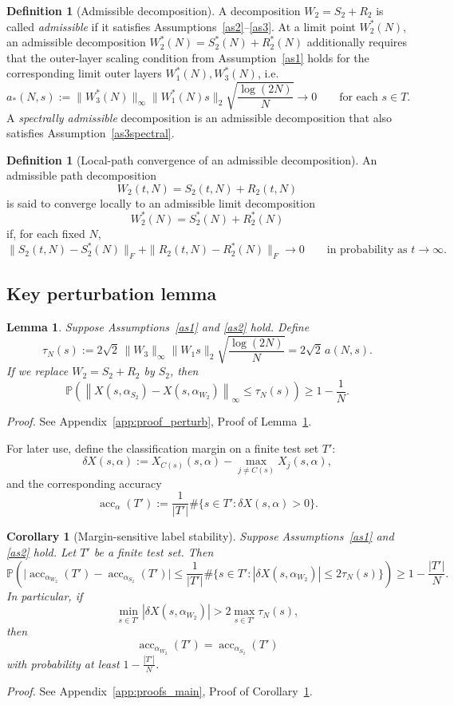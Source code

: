 \documentclass[11pt]{article}
\theoremstyle{plain}
\newtheorem{cor}[thm]{Corollary}
\newtheorem{lem}[thm]{Lemma}
\theoremstyle{definition}
\newtheorem{defn}[thm]{Definition}
\theoremstyle{remark}
\newcommand{\PP}{\mathbb{P}}
\newcommand{\acc}{\operatorname{acc}}
\newcommand{\1}{\mathbf{1}}
\newcommand{\proofloc}[1]{\par\noindent\emph{Proof.} #1\par}
\begin{document}
\begin{defn}[Admissible decomposition]
\label{def:admissible_decomposition}
A decomposition \(W_2=S_2+R_2\) is called \emph{admissible} if it satisfies Assumptions~\ref{as2}--\ref{as3}. At a limit point \(W_2^*(N)\), an admissible decomposition \(W_2^*(N)=S_2^*(N)+R_2^*(N)\) additionally requires that the outer-layer scaling condition from Assumption~\ref{as1} holds for the corresponding limit outer layers \(W_1^*(N),W_3^*(N)\), i.e.
\[
a_*(N,s):=\|W_3^*(N)\|_\infty\|W_1^*(N)s\|_2\sqrt{\frac{\log(2N)}{N}}\to0
\qquad \text{for each } s\in T.
\]
A \emph{spectrally admissible} decomposition is an admissible decomposition that also satisfies Assumption~\ref{as3spectral}.
\end{defn}

\begin{defn}[Local-path convergence of an admissible decomposition]
\label{def:local_path_convergence}
An admissible path decomposition
\[
W_2(t,N)=S_2(t,N)+R_2(t,N)
\]
is said to converge locally to an admissible limit decomposition
\[
W_2^*(N)=S_2^*(N)+R_2^*(N)
\]
if, for each fixed \(N\),
\[
\|S_2(t,N)-S_2^*(N)\|_F+\|R_2(t,N)-R_2^*(N)\|_F\to0
\qquad\text{in probability as }t\to\infty.
\]
\end{defn}

\subsection{Key perturbation lemma}
\label{subsec:key_perturbation_lemma}

\begin{lem}
\label{lem:remove_R}
Suppose Assumptions~\ref{as1} and \ref{as2} hold. Define
\[
\tau_N(s):=
2\sqrt{2}\,\|W_3\|_\infty \|W_1s\|_2\sqrt{\frac{\log(2N)}{N}}
=2\sqrt{2}\,a(N,s).
\]
If we replace \(W_2=S_2+R_2\) by \(S_2\), then
\[
\PP\!\left(
\left\|X(s,\alpha_{S_2})-X(s,\alpha_{W_2})\right\|_\infty
\le \tau_N(s)
\right)
\ge 1-\frac{1}{N}.
\]
\end{lem}
\proofloc{See Appendix~\ref{app:proof_perturb}, Proof of Lemma~\ref{lem:remove_R}.}

For later use, define the classification margin on a finite test set \(T'\):
\[
\delta X(s,\alpha):=
X_{C(s)}(s,\alpha)-\max_{j\neq C(s)}X_j(s,\alpha),
\]
and the corresponding accuracy
\[
\acc_\alpha(T'):=\frac1{|T'|}\#\{s\in T':\delta X(s,\alpha)>0\}.
\]

\begin{cor}[Margin-sensitive label stability]
\label{cor:margin_accuracy}
Suppose Assumptions~\ref{as1} and \ref{as2} hold. Let \(T'\) be a finite test set. Then
\[
\PP\!\left(
\big|\acc_{\alpha_{W_2}}(T')-\acc_{\alpha_{S_2}}(T')\big|
\le
\frac1{|T'|}
\#\Big\{
s\in T': |\delta X(s,\alpha_{W_2})|\le 2\tau_N(s)
\Big\}
\right)
\ge
1-\frac{|T'|}{N}.
\]
In particular, if
\[
\min_{s\in T'} |\delta X(s,\alpha_{W_2})|
>
2\max_{s\in T'}\tau_N(s),
\]
then
\[
\acc_{\alpha_{W_2}}(T')=\acc_{\alpha_{S_2}}(T')
\]
with probability at least \(1-\frac{|T'|}{N}\).
\end{cor}
\proofloc{See Appendix~\ref{app:proofs_main}, Proof of Corollary~\ref{cor:margin_accuracy}.}
\end{document}
